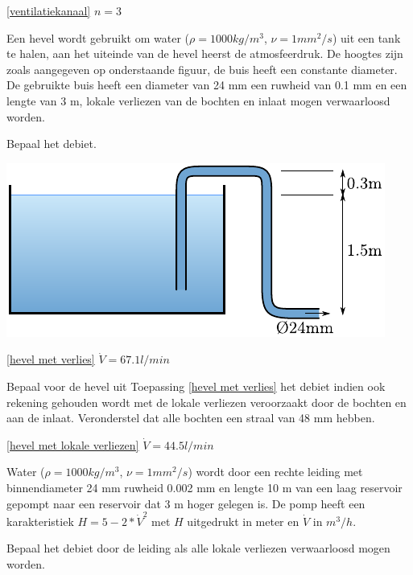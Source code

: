 \begin{antwoord}{\ref{ventilatiekanaal}}
	$n = 3$
\end{antwoord}
\begin{toepassing}
	\label{hevel met verlies}
Een hevel wordt gebruikt om water ($\rho=1000\unit{kg/m^3}$, $\nu=1\unit{mm^2/s}$) uit een tank te halen, aan het uiteinde van de hevel heerst de atmosfeerdruk. De hoogtes zijn zoals aangegeven op onderstaande figuur, de buis heeft een constante diameter. De gebruikte buis heeft een diameter van 24 mm een ruwheid van 0.1 mm en een lengte van 3 m, lokale verliezen van de bochten en inlaat mogen verwaarloosd worden.
		
Bepaal het debiet.

	\centering
	\includegraphics{fig/stroming_in_leidingen/hevel}
\end{toepassing}
\begin{antwoord}{\ref{hevel met verlies}}
	$\dot{V} = 67.1\unit{l/min}$
\end{antwoord}
\begin{toepassing}[*]
	\label{hevel met lokale verliezen}
Bepaal voor de hevel uit Toepassing \ref{hevel met verlies} het debiet indien ook rekening gehouden wordt met de lokale verliezen veroorzaakt door de bochten en aan de inlaat. Veronderstel dat alle bochten een straal van 48 mm hebben.

\end{toepassing}
\begin{antwoord}{\ref{hevel met lokale verliezen}}
	$\dot{V} = 44.5\unit{l/min}$
\end{antwoord}
\begin{toepassing}[*]
	\label{pompkarakteristiek}
Water ($\rho=1000\unit{kg/m^3}$, $\nu=1\unit{mm^2/s}$) wordt door een rechte leiding met binnendiameter 24 mm ruwheid 0.002 mm en lengte 10 m van een laag reservoir gepompt naar een reservoir dat 3 m hoger gelegen is. De pomp heeft een karakteristiek $H = 5 - 2*\dot{V}^2$ met $H$ uitgedrukt in meter en $\dot{V}$ in $\unit{m^3/h}$.

Bepaal het debiet door de leiding als alle lokale verliezen verwaarloosd mogen worden.
\end{toepassing}

